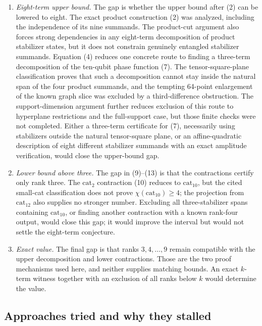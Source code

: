\documentclass[11pt]{article}
\theoremstyle{definition}
\newcommand{\cat}{\mathrm{cat}}
\begin{document}
\begin{enumerate}
\item \emph{Eight-term upper bound.} The gap is whether the upper bound after (2) can be lowered to eight. The exact product construction (2) was analyzed, including the independence of its nine summands. The product-cut argument also forces strong dependencies in any eight-term decomposition of product stabilizer states, but it does not constrain genuinely entangled stabilizer summands. Equation (4) reduces one concrete route to finding a three-term decomposition of the ten-qubit phase function (7). The tensor-square-plane classification proves that such a decomposition cannot stay inside the natural span of the four product summands, and the tempting 64-point enlargement of the known graph slice was excluded by a third-difference obstruction. The support-dimension argument further reduces exclusion of this route to hyperplane restrictions and the full-support case, but those finite checks were not completed. Either a three-term certificate for (7), necessarily using stabilizers outside the natural tensor-square plane, or an affine-quadratic description of eight different stabilizer summands with an exact amplitude verification, would close the upper-bound gap.

\item \emph{Lower bound above three.} The gap in (9)--(13) is that the contractions certify only rank three. The $\cat_2$ contraction (10) reduces to $\cat_{10}$, but the cited small-cat classification does not prove $\chi(\cat_{10})\geq4$; the projection from $\cat_{12}$ also supplies no stronger number. Excluding all three-stabilizer spans containing $\cat_{10}$, or finding another contraction with a known rank-four output, would close this gap; it would improve the interval but would not settle the eight-term conjecture.

\item \emph{Exact value.} The final gap is that ranks $3,4,\ldots,9$ remain compatible with the upper decomposition and lower contractions. Those are the two proof mechanisms used here, and neither supplies matching bounds. An exact $k$-term witness together with an exclusion of all ranks below $k$ would determine the value.
\end{enumerate}

\subsection*{Approaches tried and why they stalled}
\end{document}
